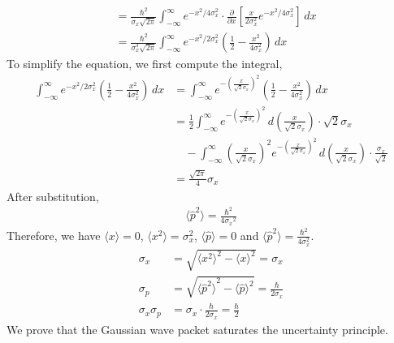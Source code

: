 \documentclass[12pt]{book} %
\numberwithin{equation}{chapter}
\def\s{\sigma}
\def\p{\partial}
\begin{document}
\begin{example}
\begin{align*}
&=\frac{{\hbar}^{2}}{\s_{x}\sqrt{2\pi}}\int_{-\infty}^{\infty}e^{-x^{2}/4\s_{x}^{2}}\cdot\frac{\p}{\p x}\left[\frac{x}{2\s_{x}^{2}}e^{-x^{2}/4\s_{x}^{2}}\right]\,dx\\
&=\frac{{\hbar}^{2}}{\s_{x}^{3}\sqrt{2\pi}}\int_{-\infty}^{\infty}e^{-x^{2}/2\s_{x}^{2}}\left(\frac{1}{2}-\frac{x^{2}}{4\s_{x}^{2}}\right)\,dx
\end{align*}
To simplify the equation, we first compute the integral,
\begin{align*}
\int_{-\infty}^{\infty}e^{-x^{2}/2\s_{x}^{2}}\left(\frac{1}{2}-\frac{x^{2}}{4\s_{x}^{2}}\right)\,dx&=\int_{-\infty}^{\infty}e^{-{\left(\frac{x}{\sqrt{2}\s_{x}}\right)}^{2}}\left(\frac{1}{2}-\frac{x^{2}}{4\s_{x}^{2}}\right)\,dx\\
&=\frac{1}{2}\int_{-\infty}^{\infty}e^{-{\left(\frac{x}{\sqrt{2}\s_{x}}\right)}^{2}}\,d\left(\frac{x}{\sqrt{2}\s_{x}}\right)\cdot\sqrt{2}\s_{x}\\
&\,\,\,\,\,\,-\int_{-\infty}^{\infty}{\left(\frac{x}{\sqrt{2}\s_{x}}\right)}^{2} e^{-{\left(\frac{x}{\sqrt{2}\s_{x}}\right)}^{2}}\,d\left(\frac{x}{\sqrt{2}\s_{x}}\right)\cdot\frac{\s_{x}}{\sqrt{2}}\\
&=\frac{\sqrt{2\pi}}{4}\s_{x}
\end{align*}
After substitution,
\begin{align*}
\langle {\hat{p}}^{2}\rangle=\frac{{\hbar}^{2}}{4{\sigma_x}^{2}}
\end{align*}
Therefore, we have $\langle x\rangle=0$, $\langle x^{2}\rangle=\s_{x}^{2}$, $\langle \hat{p}\rangle=0$ and $\langle \hat{p}^{2}\rangle=\frac{\hbar^{2}}{4\s_{x}^{2}}$.
\begin{align*}
\s_{x}&=\sqrt{{\langle x^{2}\rangle}^{2}-{\langle x\rangle}^{2}}=\s_x\\
\s_{p}&=\sqrt{{\langle {\hat{p}}^{2}\rangle}^{2}-{\langle \hat{p}\rangle}^{2}}=\frac{\hbar}{2\s_x}\\
\s_{x}\s_{p}&=\s_{x}\cdot\frac{\hbar}{2\s_x}=\frac{\hbar}{2}
\end{align*}
We prove that the Gaussian wave packet saturates the uncertainty principle.
\end{example}
\end{document}
